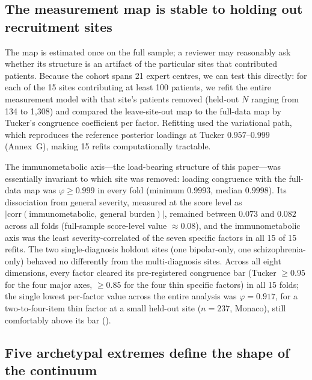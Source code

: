 \subsection{The measurement map is stable to holding out recruitment sites}

The map is estimated once on the full sample; a reviewer may reasonably ask
whether its structure is an artifact of the particular sites that contributed
patients. Because the cohort spans 21 expert centres, we can test this directly:
for each of the 15 sites contributing at least 100 patients, we refit the entire
measurement model with that site's patients removed (held-out $N$ ranging from
134 to 1{,}308) and compared the leave-site-out map to the full-data map by
Tucker's congruence coefficient per factor. Refitting used the variational
path, which reproduces the reference posterior loadings at Tucker
$0.957$--$0.999$ (Annex~G), making 15 refits computationally tractable.

The immunometabolic axis---the load-bearing structure of this paper---was
essentially invariant to which site was removed: loading congruence with the
full-data map was $\varphi \geq 0.999$ in every fold (minimum $0.9993$, median
$0.9998$). Its dissociation from general severity, measured at the score level
as $|\mathrm{corr}(\text{immunometabolic},\ \text{general burden})|$, remained
between $0.073$ and $0.082$ across all folds (full-sample score-level value $\approx 0.08$),
and the immunometabolic axis was the least severity-correlated of the seven
specific factors in all 15 of 15 refits. The two single-diagnosis holdout sites
(one bipolar-only, one schizophrenia-only) behaved no differently from the
multi-diagnosis sites. Across all eight dimensions, every factor cleared its
pre-registered congruence bar (Tucker $\geq 0.95$ for the four major axes,
$\geq 0.85$ for the four thin specific factors) in all 15 folds; the single
lowest per-factor value across the entire analysis was $\varphi = 0.917$, for a
two-to-four-item thin factor at a small held-out site ($n=237$, Monaco), still comfortably
above its bar ().

\subsection{Five archetypal extremes define the shape of the continuum}\label{subsec:archetypes}

